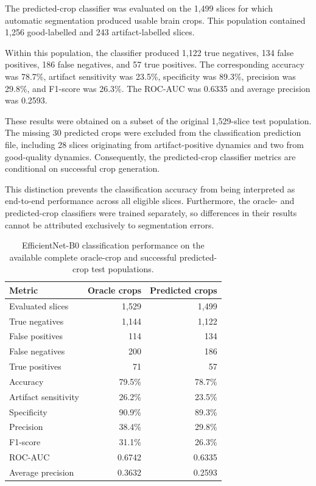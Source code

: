 The predicted-crop classifier was evaluated on the 1,499 slices for which automatic segmentation produced usable brain crops. This population contained 1,256 good-labelled and 243 artifact-labelled slices.

Within this population, the classifier produced 1,122 true negatives, 134 false positives, 186 false negatives, and 57 true positives. The corresponding accuracy was 78.7\%, artifact sensitivity was 23.5\%, specificity was 89.3\%, precision was 29.8\%, and F1-score was 26.3\%. The ROC-AUC was 0.6335 and average precision was 0.2593.

These results were obtained on a subset of the original 1,529-slice test population. The missing 30 predicted crops were excluded from the classification prediction file, including 28 slices originating from artifact-positive dynamics and two from good-quality dynamics. Consequently, the predicted-crop classifier metrics are conditional on successful crop generation.

This distinction prevents the classification accuracy from being interpreted as end-to-end performance across all eligible slices. Furthermore, the oracle- and predicted-crop classifiers were trained separately, so differences in their results cannot be attributed exclusively to segmentation errors.

\begin{table}[htbp]
\centering
\caption{EfficientNet-B0 classification performance on the available complete oracle-crop and successful predicted-crop test populations.}
\label{tab:results_2d_slice_classification}
\begin{tabular}{lrr}
\hline
Metric & Oracle crops & Predicted crops \\
\hline
Evaluated slices & 1,529 & 1,499 \\
True negatives & 1,144 & 1,122 \\
False positives & 114 & 134 \\
False negatives & 200 & 186 \\
True positives & 71 & 57 \\
Accuracy & 79.5\% & 78.7\% \\
Artifact sensitivity & 26.2\% & 23.5\% \\
Specificity & 90.9\% & 89.3\% \\
Precision & 38.4\% & 29.8\% \\
F1-score & 31.1\% & 26.3\% \\
ROC-AUC & 0.6742 & 0.6335 \\
Average precision & 0.3632 & 0.2593 \\
\hline
\end{tabular}
\end{table}

